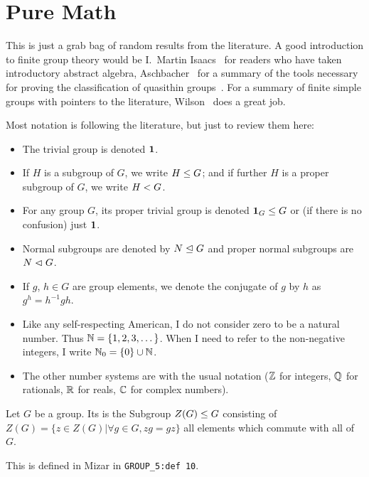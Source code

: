 \chapter{Pure Math}

\M
This is just a grab bag of random results from the literature. A good
introduction to finite group theory would be I.~Martin
Isaacs~\cite{isaacs2008finite} for readers who have taken introductory
abstract algebra, Aschbacher~\cite{aschbacher2000finite} for a summary
of the tools necessary for proving the classification of quasithin groups~\cite{aschbacher2004classification1,aschbacher2004classification2}.
For a summary of finite simple groups with pointers to the literature,
Wilson~\cite{wilson2009finite} does a great job.

 Most notation is following the literature, but just to
review them here:
\begin{itemize}%
\item The trivial group is denoted $\mathbf{1}$.
\item If $H$ is a subgroup of $G$, we write $H\leq G$; and if
  further $H$ is a proper subgroup of $G$, we write $H< G$.
\item For any group $G$, its proper trivial group is denoted
  $\mathbf{1}_{G}\leq G$ or (if there is no confusion) just
  $\mathbf{1}$.
\item Normal subgroups are denoted by $N\trianglelefteq G$ and proper
  normal subgroups are $N\mathrel{\lhd} G$.
\item If $g$, $h\in G$ are group elements, we denote the conjugate of $g$ by
$h$ as $g^{h}=h^{-1}gh$.
\item Like any self-respecting American, I do not consider zero to be a
natural number. Thus $\mathbb{N}=\{1,2,3,\dots\}$. When I need to refer to the
non-negative integers, I write $\mathbb{N}_{0}=\{0\}\cup\mathbb{N}$.
\item The other number systems are with the usual notation ($\mathbb{Z}$ for
  integers, $\mathbb{Q}$ for rationals, $\mathbb{R}$ for reals, $\mathbb{C}$ for complex numbers).
\end{itemize}

\begin{definition}
Let $G$ be a group. Its  is the Subgroup $Z(G)\leq G$
consisting of $Z(G) = \{z\in Z(G) | \forall g\in G, zg=gz\}$ all
elements which commute with all of $G$.
\end{definition}

\begin{remark}
This is defined in Mizar in \verb#GROUP_5:def 10#.
\end{remark}

